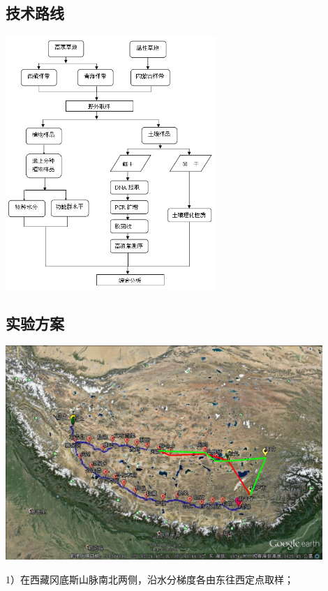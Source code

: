 \subsection{技术路线}
\begin{frame}{\insertsection}{\insertsubsection}
	\begin{center}
		\includegraphics[width = 0.6\textwidth]{./pic/技术路线.jpg}
	\end{center}
\end{frame}
\subsection{实验方案}
\begin{frame}{\insertsection}{\insertsubsection}
	\begin{center}
		\includegraphics[width = 0.9\textwidth]{./pic/西藏瓦岗.jpg}
	\end{center}
	1）在西藏冈底斯山脉南北两侧，沿水分梯度各由东往西定点取样；
\end{frame}

